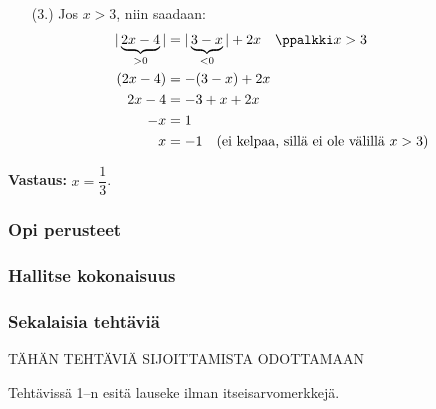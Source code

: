 \begin{esimerkki}
\begin{esimratk}
\begin{itemize}
\item[(3.)] Jos $x>3$, niin saadaan:
\begin{align*}
	|\underbrace{2x-4}_{>0}|&=|\underbrace{3-x}_{<0}|+2x \quad \ppalkki x>3  \\
	(2x-4)&=-(3-x)+2x \\
	2x-4&=-3+x+2x \\
	-x &= 1 \\
	x &= -1  \quad \text{(ei kelpaa, sillä ei ole välillä $x>3$)}
\end{align*}
\end{itemize}
\end{esimratk}
\textbf{Vastaus: }\quad $x=\dfrac{1}{3}$.

\end{esimerkki}

\begin{tehtavasivu}

\subsubsection*{Opi perusteet}

\subsubsection*{Hallitse kokonaisuus}

\subsubsection*{Sekalaisia tehtäviä}

TÄHÄN TEHTÄVIÄ SIJOITTAMISTA ODOTTAMAAN

Tehtävissä 1--n esitä lauseke ilman itseisarvomerkkejä.


\end{tehtavasivu}
